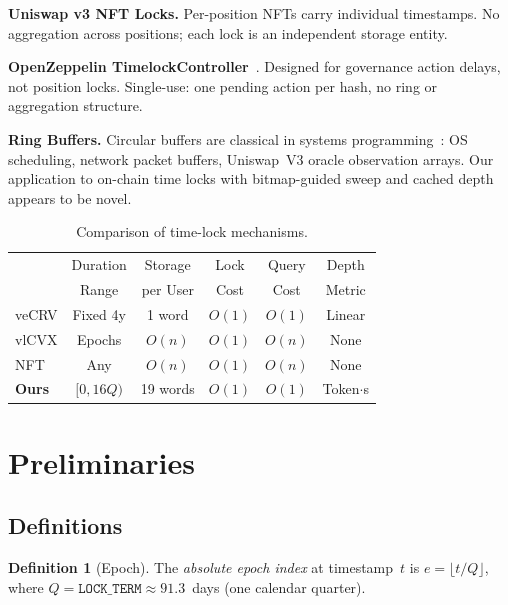 \documentclass[10pt,a4paper,twocolumn]{article}
\theoremstyle{definition}
\newtheorem{definition}{Definition}[section]
\theoremstyle{plain}
\theoremstyle{remark}
\begin{document}
\textbf{Uniswap v3 NFT Locks.} Per-position NFTs carry individual timestamps. No aggregation across positions; each lock is an independent storage entity.

\textbf{OpenZeppelin TimelockController}~\cite{oz-timelock}. Designed for governance action delays, not position locks. Single-use: one pending action per hash, no ring or aggregation structure.

\textbf{Ring Buffers.} Circular buffers are classical in systems programming~\cite{ring-buffer}: OS scheduling, network packet buffers, Uniswap~V3 oracle observation arrays. Our application to on-chain time locks with bitmap-guided sweep and cached depth appears to be novel.

\begin{table}[htbp]
\centering
\caption{Comparison of time-lock mechanisms.}
\label{tab:comparison}
\small
\begin{tabular}{@{}lccccc@{}}
\toprule
& Duration & Storage & Lock & Query & Depth \\
& Range & per User & Cost & Cost & Metric \\
\midrule
veCRV & Fixed 4y & 1 word & $O(1)$ & $O(1)$ & Linear \\
vlCVX & Epochs & $O(n)$ & $O(1)$ & $O(n)$ & None \\
NFT & Any & $O(n)$ & $O(1)$ & $O(n)$ & None \\
\textbf{Ours} & $[0,16Q)$ & 19 words & $O(1)$ & $O(1)$ & Token$\cdot$s \\
\bottomrule
\end{tabular}
\end{table}

\section{Preliminaries}
\label{sec:preliminaries}

\subsection{Definitions}
\label{subsec:definitions}

\begin{definition}[Epoch]
\label{def:epoch}
The \emph{absolute epoch index} at timestamp~$t$ is $e = \lfloor t / Q \rfloor$, where $Q = \texttt{LOCK\_TERM} \approx 91.3$~days (one calendar quarter).
\end{definition}
\end{document}

